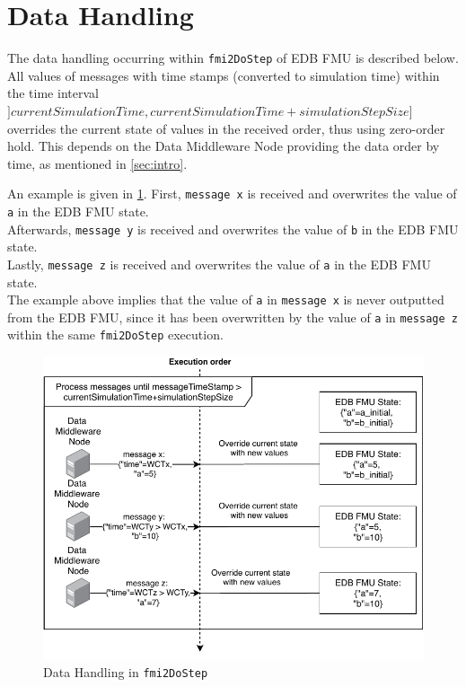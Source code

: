 \section{Data Handling}\label{sec:data_handling}
The data handling occurring within \texttt{fmi2DoStep} of EDB FMU is described
below.
All values of messages with time stamps (converted to simulation time) within the
time interval $]currentSimulationTime,currentSimulationTime + simulationStepSize]$
overrides the current state of values in the received order, thus using
zero-order hold. This depends on the Data Middleware Node providing the data
order by time, as mentioned in \cref{sec:intro}.

An example is given in \cref{fig:data-handling-dostep}.
First, \texttt{message x} is received and overwrites the value of \texttt{a} in the EDB FMU state.\\
Afterwards, \texttt{message y} is received and overwrites the value of \texttt{b} in
the EDB FMU state.\\
Lastly, \texttt{message z} is received and overwrites the value of
\texttt{a} in the EDB FMU state. \\
The example above implies that the value of \texttt{a} in \texttt{message x}  is never
outputted from the EDB FMU, since it has been overwritten by the value of
\texttt{a} in \texttt{message z} within the same \texttt{fmi2DoStep} execution.

\begin{figure}[htb]
  \centering
  \includegraphics[width=\textwidth]{figures/datahandling.pdf}
  \caption{Data Handling in \texttt{fmi2DoStep}}
  \label{fig:data-handling-dostep}
\end{figure}

